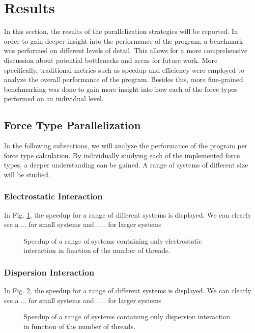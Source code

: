 \documentclass[conference]{IEEEtran}
\begin{document}
\section{Results}
In this section, the results of the parallelization strategies will be reported. In order to gain deeper insight into
the performance of the program, a benchmark was performed on different levels of detail. This allows for a more
comprehensive discussion about potential bottlenecks and areas for future work. More specifically, traditional
metrics such as speedup and efficiency were employed to analyze the overall performance of the program. Besides this,
more fine-grained benchmarking was done to gain more insight into how each of the force types performed on an
individual level.

    \subsection{Force Type Parallelization}
    In the following subsections, we will analyze the performance of the program per force type calculation. By
    individually studying each of the implemented force types, a deeper understanding can be gained. A range of 
    systems of different size will be studied.


        \subsubsection{Electrostatic Interaction}
        In Fig. \ref{fig:electro-speedup}, the speedup for a range of different systems is displayed. We can clearly
        see a ... for small systems and ..... for larger systems
        \begin{figure}[H]
            \centering
            \caption{Speedup of a range of systems containing only electrostatic interaction in function of the number 
            of threads.}\label{fig:electro-speedup}
        \end{figure}


        \subsubsection{Dispersion Interaction}
        In Fig. \ref{fig:dispersion-speedup}, the speedup for a range of different systems is displayed. We can clearly
        see a ... for small systems and ..... for larger systems
        \begin{figure}[H]
            \centering
            \caption{Speedup of a range of systems containing only dispersion interaction in function of the number 
            of threads.}\label{fig:dispersion-speedup}
        \end{figure}
\end{document}
